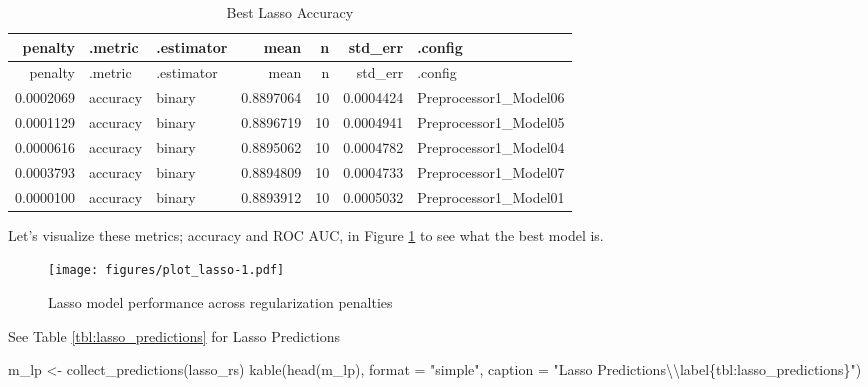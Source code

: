 \documentclass[
]{article}
\newenvironment{Shaded}{}{}
\newcommand{\AttributeTok}[1]{\textcolor[rgb]{0.49,0.56,0.16}{#1}}
\newcommand{\FunctionTok}[1]{\textcolor[rgb]{0.02,0.16,0.49}{#1}}
\newcommand{\NormalTok}[1]{#1}
\newcommand{\OtherTok}[1]{\textcolor[rgb]{0.00,0.44,0.13}{#1}}
\newcommand{\SpecialCharTok}[1]{\textcolor[rgb]{0.25,0.44,0.63}{#1}}
\newcommand{\StringTok}[1]{\textcolor[rgb]{0.25,0.44,0.63}{#1}}
\begin{document}
\begin{longtable}[]{@{}rllrrrl@{}}
\caption{Best Lasso Accuracy\label{tbl:best_lasso_acc}}\tabularnewline
\toprule
penalty & .metric & .estimator & mean & n & std\_err & .config \\
\midrule
\endfirsthead
\toprule
penalty & .metric & .estimator & mean & n & std\_err & .config \\
\midrule
\endhead
0.0002069 & accuracy & binary & 0.8897064 & 10 & 0.0004424 &
Preprocessor1\_Model06 \\
0.0001129 & accuracy & binary & 0.8896719 & 10 & 0.0004941 &
Preprocessor1\_Model05 \\
0.0000616 & accuracy & binary & 0.8895062 & 10 & 0.0004782 &
Preprocessor1\_Model04 \\
0.0003793 & accuracy & binary & 0.8894809 & 10 & 0.0004733 &
Preprocessor1\_Model07 \\
0.0000100 & accuracy & binary & 0.8893912 & 10 & 0.0005032 &
Preprocessor1\_Model01 \\
\bottomrule
\end{longtable}

Let's visualize these metrics; accuracy and ROC AUC, in Figure
\ref{fig:model_7} to see what the best model is.

\begin{figure}
\centering
\texttt{[image: figures/plot\_lasso-1.pdf]}
\caption{Lasso model performance across regularization
penalties\label{fig:model_7}}
\end{figure}

See Table \ref{tbl:lasso_predictions} for Lasso Predictions

\begin{Shaded}
\begin{Highlighting}[]
\NormalTok{m\_lp }\OtherTok{\textless{}{-}} \FunctionTok{collect\_predictions}\NormalTok{(lasso\_rs)}
\FunctionTok{kable}\NormalTok{(}\FunctionTok{head}\NormalTok{(m\_lp), }\AttributeTok{format =} \StringTok{"simple"}\NormalTok{, }\AttributeTok{caption =} \StringTok{"Lasso Predictions}\SpecialCharTok{\textbackslash{}\textbackslash{}}\StringTok{label\{tbl:lasso\_predictions\}"}\NormalTok{)}
\end{Highlighting}
\end{Shaded}
\end{document}
